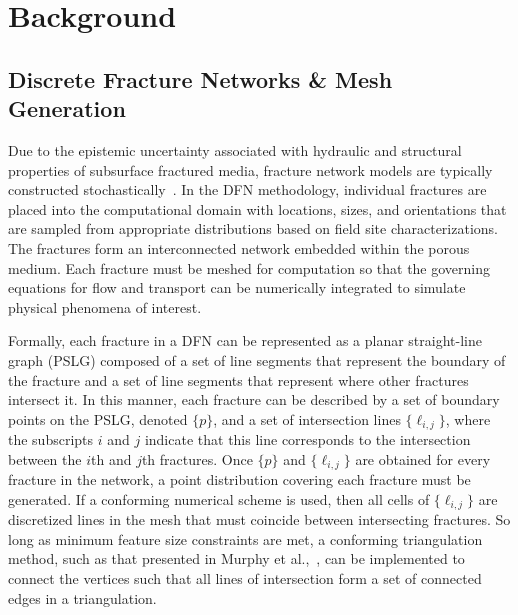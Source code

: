 \documentclass[preprint, 10pt]{elsarticle}
\theoremstyle{definition}
\theoremstyle{remark}
\begin{document}
\section{Background}\label{sec:background}


\subsection{Discrete Fracture Networks \& Mesh Generation}\label{ssec:dfn}

Due to the epistemic uncertainty associated with hydraulic and structural properties of subsurface fractured media, fracture network models are typically constructed stochastically~\cite{national2020characterization,national1996rock,neuman2005trends}.
In the DFN methodology, individual fractures are placed into the computational domain with locations, sizes, and orientations that are sampled from appropriate distributions based on field site characterizations.
The fractures form an interconnected network embedded within the porous medium. 
Each fracture must be meshed for computation so that the governing equations for flow and transport can be numerically integrated to simulate physical phenomena of interest.

Formally, each fracture in a DFN can be represented as a planar straight-line graph (PSLG) composed of a set of line segments that represent the boundary of the fracture and a set of line segments that represent where other fractures intersect it. 
In this manner, each fracture can be described by a set of boundary points on the PSLG, denoted $\{p\}$, and a set of intersection lines $\{\ell_{i,j}\}$, where the subscripts $i$ and $j$ indicate that this line corresponds to the intersection between the $i$th and $j$th fractures. 
Once $\{p\}$ and $\{\ell_{i,j}\}$ are obtained for every fracture in the network, a point distribution covering each fracture must be generated.
If a conforming numerical scheme is used, then all cells of $\{\ell_{i,j}\}$ are discretized lines in the mesh that must coincide between intersecting fractures. 
So long as minimum feature size constraints are met, a conforming triangulation method, such as that presented in Murphy et al.,~\cite{murphy2001point}, can be implemented to connect the vertices such that all lines of intersection form a set of connected edges in a triangulation.
\end{document}
